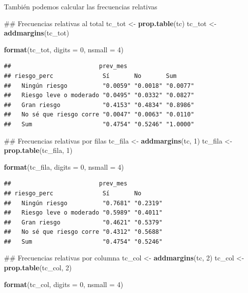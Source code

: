 \documentclass[spanish,]{book}
\newenvironment{Shaded}{\begin{snugshade}}{\end{snugshade}}
\newcommand{\KeywordTok}[1]{\textcolor[rgb]{0.13,0.29,0.53}{\textbf{#1}}}
\newcommand{\DataTypeTok}[1]{\textcolor[rgb]{0.13,0.29,0.53}{#1}}
\newcommand{\DecValTok}[1]{\textcolor[rgb]{0.00,0.00,0.81}{#1}}
\newcommand{\StringTok}[1]{\textcolor[rgb]{0.31,0.60,0.02}{#1}}
\newcommand{\NormalTok}[1]{#1}
\begin{document}
También podemos calcular las frecuencias relativas

\begin{Shaded}
\begin{Highlighting}[]
\NormalTok{## Frecuencias relativas al total}
\NormalTok{tc_tot <-}\StringTok{ }\KeywordTok{prop.table}\NormalTok{(tc)}
\NormalTok{tc_tot <-}\StringTok{ }\KeywordTok{addmargins}\NormalTok{(tc_tot)}

\KeywordTok{format}\NormalTok{(tc_tot, }\DataTypeTok{digits =} \DecValTok{0}\NormalTok{, }\DataTypeTok{nsmall =} \DecValTok{4}\NormalTok{)}
\end{Highlighting}
\end{Shaded}

\begin{verbatim}
##                         prev_mes
## riesgo_perc              Sí       No       Sum     
##   Ningún riesgo          "0.0059" "0.0018" "0.0077"
##   Riesgo leve o moderado "0.0495" "0.0332" "0.0827"
##   Gran riesgo            "0.4153" "0.4834" "0.8986"
##   No sé que riesgo corre "0.0047" "0.0063" "0.0110"
##   Sum                    "0.4754" "0.5246" "1.0000"
\end{verbatim}

\begin{Shaded}
\begin{Highlighting}[]
\NormalTok{## Frecuencias relativas por filas}
\NormalTok{tc_fila <-}\StringTok{ }\KeywordTok{addmargins}\NormalTok{(tc, }\DecValTok{1}\NormalTok{)}
\NormalTok{tc_fila <-}\StringTok{ }\KeywordTok{prop.table}\NormalTok{(tc_fila, }\DecValTok{1}\NormalTok{)}

\KeywordTok{format}\NormalTok{(tc_fila, }\DataTypeTok{digits =} \DecValTok{0}\NormalTok{, }\DataTypeTok{nsmall =} \DecValTok{4}\NormalTok{)}
\end{Highlighting}
\end{Shaded}

\begin{verbatim}
##                         prev_mes
## riesgo_perc              Sí       No      
##   Ningún riesgo          "0.7681" "0.2319"
##   Riesgo leve o moderado "0.5989" "0.4011"
##   Gran riesgo            "0.4621" "0.5379"
##   No sé que riesgo corre "0.4312" "0.5688"
##   Sum                    "0.4754" "0.5246"
\end{verbatim}

\begin{Shaded}
\begin{Highlighting}[]
\NormalTok{## Frecuencias relativas por columna}
\NormalTok{tc_col <-}\StringTok{ }\KeywordTok{addmargins}\NormalTok{(tc, }\DecValTok{2}\NormalTok{)}
\NormalTok{tc_col <-}\StringTok{ }\KeywordTok{prop.table}\NormalTok{(tc_col, }\DecValTok{2}\NormalTok{)}

\KeywordTok{format}\NormalTok{(tc_col, }\DataTypeTok{digits =} \DecValTok{0}\NormalTok{, }\DataTypeTok{nsmall =} \DecValTok{4}\NormalTok{)}
\end{Highlighting}
\end{Shaded}
\end{document}

